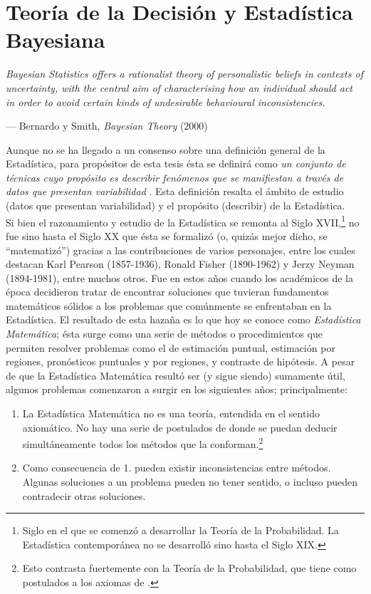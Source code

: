 \chapter[Estadística Bayesiana]{Teoría de la Decisión y Estadística Bayesiana} \label{chapter:bayesiana}

\epigraph{\textit{Bayesian Statistics offers a rationalist theory of personalistic beliefs in contexts of uncertainty, with the central aim of characterising how an individual should act in order to avoid certain kinds of undesirable behavioural inconsistencies.}}{--- Bernardo y Smith, \textit{Bayesian Theory} (2000)}


Aunque no se ha llegado a un consenso sobre una definición general de la Estadística, para propósitos de esta tesis ésta se definirá como \textit{un conjunto de técnicas cuyo propósito es describir fenómenos que se manifiestan a través de datos que presentan variabilidad} \citep{notas_bayes}. Esta definición resalta el ámbito de estudio (datos que presentan variabilidad) y el propósito (describir) de la Estadística. \\


Si bien el razonamiento y estudio de la Estadística se remonta al Siglo XVII,\footnote{Siglo en el que se comenzó a desarrollar la Teoría de la Probabilidad. La Estadística contemporánea no se desarrolló sino hasta el Siglo XIX.} no fue sino hasta el Siglo XX que ésta se formalizó (o, quizás mejor dicho, se ``matematizó'') gracias a las contribuciones de varios personajes, entre los cuales destacan Karl Pearson (1857-1936), Ronald Fisher (1890-1962) y Jerzy Neyman (1894-1981), entre muchos otros. Fue en estos años cuando los académicos de la época decidieron tratar de encontrar soluciones que tuvieran fundamentos matemáticos sólidos a los problemas que comúnmente se enfrentaban en la Estadística. El resultado de esta hazaña es lo que hoy se conoce como \textit{Estadística Matemática}; ésta surge como una serie de métodos o procedimientos que permiten resolver problemas como el de estimación puntual, estimación por regiones, pronósticos puntuales y por regiones, y contraste de hipótesis. A pesar de que la Estadística Matemática resultó ser (y sigue siendo) sumamente útil, algunos problemas comenzaron a surgir en los siguientes años; principalmente:

\begin{enumerate}
\item La Estadística Matemática no es una teoría, entendida en el sentido axiomático. No hay una serie de postulados de donde se puedan deducir simultáneamente todos los métodos que la conforman.\footnote{Esto contrasta fuertemente con la Teoría de la Probabilidad, que tiene como postulados a los axiomas de \cite{kolmogorov}.}
\item Como consecuencia de 1. pueden existir inconsistencias entre métodos. Algunas soluciones a un problema pueden no tener sentido, o incluso pueden contradecir otras soluciones.
\end{enumerate}

